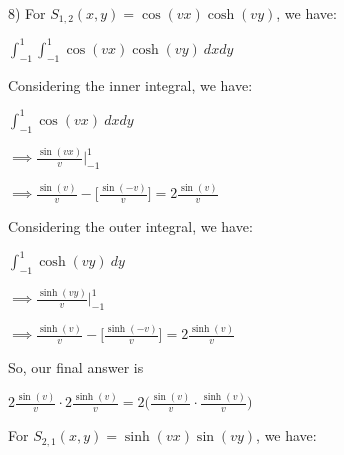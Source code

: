 \documentclass[executivepaper]{article}
\begin{document}
\begin{flushleft}

8) For $S_{1,2}(x,y)=\cos(vx)\cosh(vy)$, we have:

\begin{center}

$\int_{-1}^{1} \int_{-1}^{1} \cos(vx)\cosh(vy) \ dx dy$

\end{center}

Considering the inner integral, we have:

\begin{center}

$\int_{-1}^{1} \cos(vx) \ dx dy$

\vspace{1mm}

$\implies \frac{\sin(vx)}{v} \Big|_{-1}^{1}$

\vspace{1mm}

$\implies \frac{\sin(v)}{v} - \bigg[\frac{\sin(-v)}{v}\bigg]=2\frac{\sin(v)}{v}$

\end{center}

Considering the outer integral, we have:

\begin{center}

$\int_{-1}^{1} \cosh(vy) \ dy$

\vspace{1mm}

$\implies \frac{\sinh(vy)}{v} \Big|_{-1}^{1}$

\vspace{1mm}

$\implies \frac{\sinh(v)}{v} - \bigg[\frac{\sinh(-v)}{v}\bigg]=2\frac{\sinh(v)}{v}$

\end{center}

So, our final answer is

\begin{center}

$2\frac{\sin(v)}{v} \cdot 2\frac{\sinh(v)}{v}=2\bigg(\frac{\sin(v)}{v} \cdot \frac{\sinh(v)}{v}\bigg)$

\end{center}

\pagebreak

\vspace*{-40mm}

For $S_{2,1}(x,y)=\sinh(vx)\sin(vy)$, we have:

\begin{center}


\end{center}
\end{flushleft}
\end{document}
